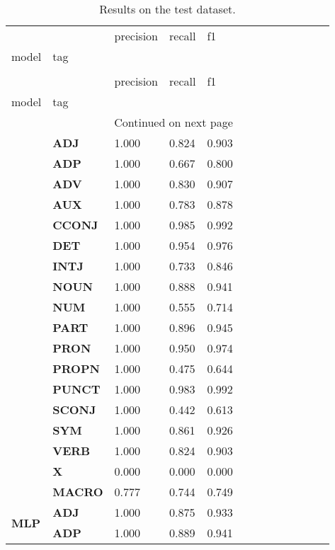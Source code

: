 \begin{longtable}{|l||l||l||l||l||l||l||l||l||l||l||l||l|}
\caption{Results on the test dataset.} \label{tab::ex_3_test} \\
\toprule
 &  & precision & recall & f1 \\
model & tag &  &  &  \\
\midrule
\endfirsthead
\caption[]{Results on the test dataset.} \\
\toprule
 &  & precision & recall & f1 \\
model & tag &  &  &  \\
\midrule
\endhead
\midrule
\multicolumn{5}{r}{Continued on next page} \\
\midrule
\endfoot
\bottomrule
\endlastfoot
\multirow[t]{18}{*}{\textbf{Baseline}} & \textbf{ADJ} & 1.000 & 0.824 & 0.903 \\
\textbf{} & \textbf{ADP} & 1.000 & 0.667 & 0.800 \\
\textbf{} & \textbf{ADV} & 1.000 & 0.830 & 0.907 \\
\textbf{} & \textbf{AUX} & 1.000 & 0.783 & 0.878 \\
\textbf{} & \textbf{CCONJ} & 1.000 & 0.985 & 0.992 \\
\textbf{} & \textbf{DET} & 1.000 & 0.954 & 0.976 \\
\textbf{} & \textbf{INTJ} & 1.000 & 0.733 & 0.846 \\
\textbf{} & \textbf{NOUN} & 1.000 & 0.888 & 0.941 \\
\textbf{} & \textbf{NUM} & 1.000 & 0.555 & 0.714 \\
\textbf{} & \textbf{PART} & 1.000 & 0.896 & 0.945 \\
\textbf{} & \textbf{PRON} & 1.000 & 0.950 & 0.974 \\
\textbf{} & \textbf{PROPN} & 1.000 & 0.475 & 0.644 \\
\textbf{} & \textbf{PUNCT} & 1.000 & 0.983 & 0.992 \\
\textbf{} & \textbf{SCONJ} & 1.000 & 0.442 & 0.613 \\
\textbf{} & \textbf{SYM} & 1.000 & 0.861 & 0.926 \\
\textbf{} & \textbf{VERB} & 1.000 & 0.824 & 0.903 \\
\textbf{} & \textbf{X} & 0.000 & 0.000 & 0.000 \\
\textbf{} & \textbf{MACRO} & 0.777 & 0.744 & 0.749 \\
\cline{1-5}
\multirow[t]{18}{*}{\textbf{MLP}} & \textbf{ADJ} & 1.000 & 0.875 & 0.933 \\
\textbf{} & \textbf{ADP} & 1.000 & 0.889 & 0.941 \\

\end{longtable}
